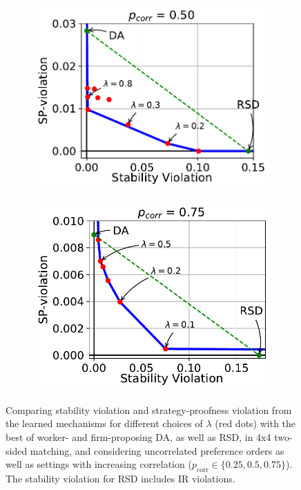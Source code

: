 \documentclass[11pt,letterpaper]{article}
\theoremstyle{definition}
\begin{document}
\begin{figure}[h!]
\begin{subfigure}[b]{0.49\textwidth}
\includegraphics[scale=0.65]{plots/p_0.20_corr_0.50.pdf}
\end{subfigure}
\begin{subfigure}[b]{0.49\textwidth}
\centering
\includegraphics[scale=0.65]{plots/p_0.20_corr_0.75.pdf}
\end{subfigure}
\caption{\label{fig:frontier} Comparing stability violation and strategy-proofness violation from the learned mechanisms for different choices of $\lambda$ (red dots) with the best of worker- and firm-proposing DA, as well as RSD, in 4x4 two-sided matching, and considering uncorrelated preference orders as well as settings with increasing correlation ($p_{\mathrm{corr}}\in \{0.25, 0.5, 0.75\}$). The stability violation for RSD includes IR violations.}
\vspace{-10pt}
\end{figure}
\end{document}
